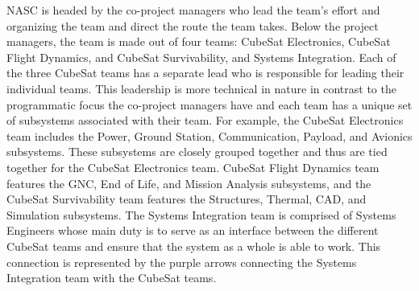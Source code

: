 NASC is headed by the co-project managers who lead the team's effort and organizing the team and direct the route the team takes. Below the project managers, the team is made out of four teams: CubeSat Electronics, CubeSat Flight Dynamics, and CubeSat Survivability, and Systems Integration. Each of the three CubeSat teams has a separate lead who is responsible for leading their individual teams. This leadership is more technical in nature in contrast to the programmatic focus the co-project managers have and each team has a unique set of subsystems associated with their team. For example, the CubeSat Electronics team includes the Power, Ground Station, Communication, Payload, and Avionics subsystems. These subsystems are closely grouped together and thus are tied together for the CubeSat Electronics team. CubeSat Flight Dynamics team features the GNC, End of Life, and Mission Analysis subsystems, and the CubeSat Survivability team features the Structures, Thermal, CAD, and Simulation subsystems. The Systems Integration team is comprised of Systems Engineers whose main duty is to serve as an interface between the different CubeSat teams and ensure that the system as a whole is able to work. This connection is represented by the purple arrows connecting the Systems Integration team with the CubeSat teams. 


